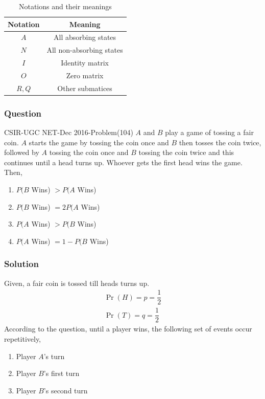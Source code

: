 \documentclass{beamer}
\providecommand{\pr}[1]{\ensuremath{\Pr\left(#1\right)}}
\begin{document}
\begin{frame}
\frametitle{}
\begin{block}{}
    \begin{table}[h!]
\centering
\caption{Notations and their meanings}
\label{table:2}
\begin{tabular}{|c|c|}
    \hline
    Notation & Meaning \\
    \hline
    $A$ & All absorbing states\\[1ex]
    \hline
    $N$ & All non-absorbing states\\[1ex]
    \hline
    $I$ & Identity matrix\\[1ex]
    \hline
    $O$ & Zero matrix\\[1ex]
    \hline
    $R,Q$ & Other submatices\\[1ex]
    \hline
\end{tabular}
\end{table}
\end{block}
\end{frame}

\begin{frame}
\frametitle{Question}
\begin{block}{CSIR-UGC NET-Dec 2016-Problem(104)}
$A$ and $B$ play a game of tossing a fair coin. $A$ starts the game by tossing the coin once and $B$ then tosses the coin twice, followed by $A$ tossing the coin once and $B$ tossing the coin twice and this continues until a head turns up. Whoever gets the first head wins the game. Then, 
\begin{enumerate}
    \item $P(B$ Wins) $> P(A$ Wins)
    \item $P(B$ Wins) $= 2P(A$ Wins)
    \item $P(A$ Wins) $> P(B$ Wins)
    \item $P(A$ Wins) $= 1-P(B$ Wins)
\end{enumerate}
\end{block}
\end{frame}

\begin{frame}
\frametitle{Solution}
Given, a fair coin is tossed till heads turns up.
\begin{align}
\label{eq:0}
    \pr{H}=p=\dfrac{1}{2}\\\pr{T}=q=\dfrac{1}{2}
\end{align}
According to the question, until a player wins, the following set of events occur repetitively, 
\begin{enumerate}
    \item Player $A$'s turn
    \item Player $B$'s first turn
    \item Player $B$'s second turn
\end{enumerate}
\end{frame}
\end{document}
